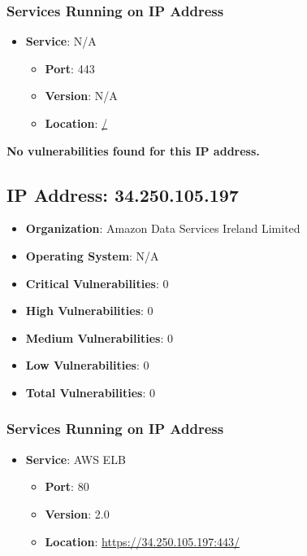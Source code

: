 \documentclass{article}
\begin{document}
\subsubsection*{Services Running on IP Address}

\begin{itemize}
    
        \item \textbf{Service}: N/A
        \begin{itemize}
            \item \textbf{Port}: 443
            \item \textbf{Version}:  N/A 
            \item \textbf{Location}: \href{ / }{ / }
        \end{itemize}
    
\end{itemize}


\textbf{No vulnerabilities found for this IP address.}




\clearpage



\subsection*{IP Address: 34.250.105.197}

\begin{itemize}
    \item \textbf{Organization}: Amazon Data Services Ireland Limited
    \item \textbf{Operating System}:  N/A 
    \item \textbf{Critical Vulnerabilities}: 0
    \item \textbf{High Vulnerabilities}: 0
    \item \textbf{Medium Vulnerabilities}: 0
    \item \textbf{Low Vulnerabilities}: 0
    \item \textbf{Total Vulnerabilities}: 0
\end{itemize}

\subsubsection*{Services Running on IP Address}

\begin{itemize}
    
        \item \textbf{Service}: AWS ELB
        \begin{itemize}
            \item \textbf{Port}: 80
            \item \textbf{Version}:  2.0 
            \item \textbf{Location}: \href{ https://34.250.105.197:443/ }{ https://34.250.105.197:443/ }
        \end{itemize}
    
\end{itemize}
\end{document}
